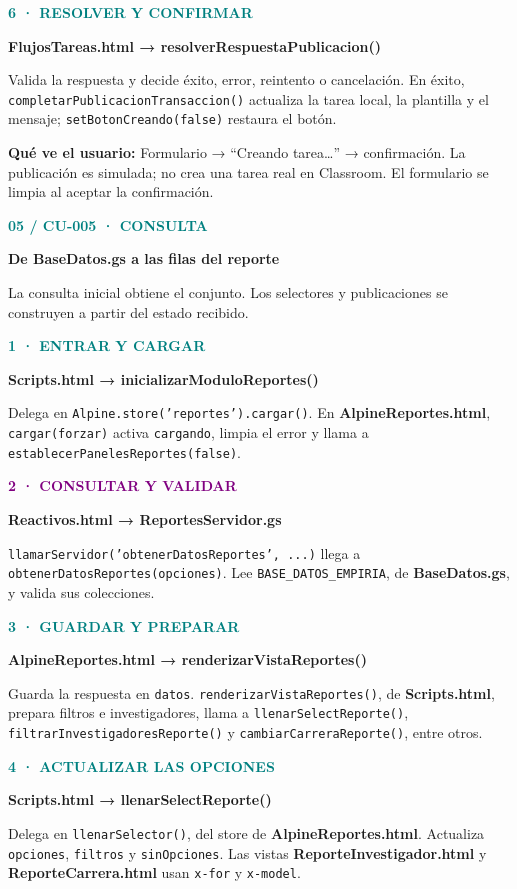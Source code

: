 \documentclass[11pt,a4paper]{article}
\newcommand{\titulo}[3]{\textcolor{teal}{\small\textbf{#1}}\par{\LARGE\bfseries #2}\par\vspace{2mm}#3\par\vspace{3mm}}
\newcommand{\paso}[4]{\begin{tcolorbox}[colback=#1!5!white,colframe=#1!40!white,boxrule=0.5pt,arc=2mm,left=3mm,right=3mm,top=2mm,bottom=2mm]\textcolor{#1}{\textbf{#2}}\par\textbf{#3}\par #4\end{tcolorbox}}
\newcommand{\nota}[2]{\begin{tcolorbox}[colback=amber!8!white,colframe=amber!40!white,boxrule=0.5pt,arc=2mm]\textcolor{amber}{\textbf{#1}} #2\end{tcolorbox}}
\newcommand{\archivo}[1]{\textbf{#1}}
\newcommand{\met}[1]{\texttt{#1}}
\begin{document}
\paso{teal}{6 · RESOLVER Y CONFIRMAR}{FlujosTareas.html → resolverRespuestaPublicacion()}{Valida la respuesta y decide éxito, error, reintento o cancelación. En éxito, \met{completarPublicacionTransaccion()} actualiza la tarea local, la plantilla y el mensaje; \met{setBotonCreando(false)} restaura el botón.}
\nota{Qué ve el usuario:}{Formulario → ``Creando tarea…'' → confirmación. La publicación es simulada; no crea una tarea real en Classroom. El formulario se limpia al aceptar la confirmación.}
\vspace{5mm}
\begin{center}
\end{center}
\newpage
\titulo{05 / CU-005 · CONSULTA}{De BaseDatos.gs a las filas del reporte}{La consulta inicial obtiene el conjunto. Los selectores y publicaciones se construyen a partir del estado recibido.}
\paso{teal}{1 · ENTRAR Y CARGAR}{Scripts.html → inicializarModuloReportes()}{Delega en \met{Alpine.store('reportes').cargar()}. En \archivo{AlpineReportes.html}, \met{cargar(forzar)} activa \met{cargando}, limpia el error y llama a \met{establecerPanelesReportes(false)}.}
\paso{purple}{2 · CONSULTAR Y VALIDAR}{Reactivos.html → ReportesServidor.gs}{\met{llamarServidor('obtenerDatosReportes', ...)} llega a \met{obtenerDatosReportes(opciones)}. Lee \met{BASE\_DATOS\_EMPIRIA}, de \archivo{BaseDatos.gs}, y valida sus colecciones.}
\paso{teal}{3 · GUARDAR Y PREPARAR}{AlpineReportes.html → renderizarVistaReportes()}{Guarda la respuesta en \met{datos}. \met{renderizarVistaReportes()}, de \archivo{Scripts.html}, prepara filtros e investigadores, llama a \met{llenarSelectReporte()}, \met{filtrarInvestigadoresReporte()} y \met{cambiarCarreraReporte()}, entre otros.}
\paso{teal}{4 · ACTUALIZAR LAS OPCIONES}{Scripts.html → llenarSelectReporte()}{Delega en \met{llenarSelector()}, del store de \archivo{AlpineReportes.html}. Actualiza \met{opciones}, \met{filtros} y \met{sinOpciones}. Las vistas \archivo{ReporteInvestigador.html} y \archivo{ReporteCarrera.html} usan \met{x-for} y \met{x-model}.}
\end{document}
